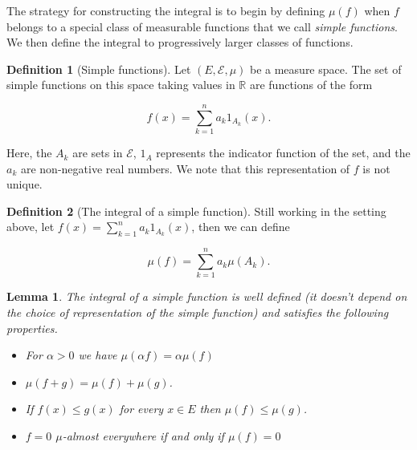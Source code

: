 \documentclass[
]{book}
\providecommand{\tightlist}{%
  \setlength{\itemsep}{0pt}\setlength{\parskip}{0pt}}
\newtheorem{lemma}{Lemma}[chapter]
\theoremstyle{definition}
\newtheorem{definition}{Definition}[chapter]
\theoremstyle{definition}
\theoremstyle{definition}
\theoremstyle{definition}
\theoremstyle{remark}
\begin{document}
The strategy for constructing the integral is to begin by defining \(\mu(f)\) when \(f\) belongs to a special class of measurable functions that we call \emph{simple functions}. We then define the integral to progressively larger classes of functions.

\begin{definition}[Simple functions]
Let \((E, \mathcal{E}, \mu)\) be a measure space. The set of simple functions on this space taking values in \(\mathbb{R}\) are functions of the form

\[ f(x) = \sum_{k=1}^n a_k 1_{A_k}(x). \]

Here, the \(A_k\) are sets in \(\mathcal{E}\), \(1_{A}\) represents the indicator function of the set, and the \(a_k\) are non-negative real numbers. We note that this representation of \(f\) is not unique.
\end{definition}

\begin{definition}[The integral of a simple function]
Still working in the setting above, let \(f(x) = \sum_{k=1}^n a_k 1_{A_k}(x)\), then we can define

\[ \mu(f) = \sum_{k=1}^n a_k \mu(A_k). \]
\end{definition}

\begin{lemma}

The integral of a simple function is well defined (it doesn't depend on the choice of representation of the simple function) and satisfies the following properties.

\begin{itemize}
\tightlist
\item
  For \(\alpha >0\) we have \(\mu(\alpha f) = \alpha \mu(f)\)
\item
  \(\mu(f+g) = \mu(f) + \mu(g)\).
\item
  If \(f(x) \leq g(x)\) for every \(x \in E\) then \(\mu(f) \leq \mu(g)\).
\item
  \(f=0\) \(\mu\)-almost everywhere if and only if \(\mu(f)=0\)
\end{itemize}

\end{lemma}
\end{document}
